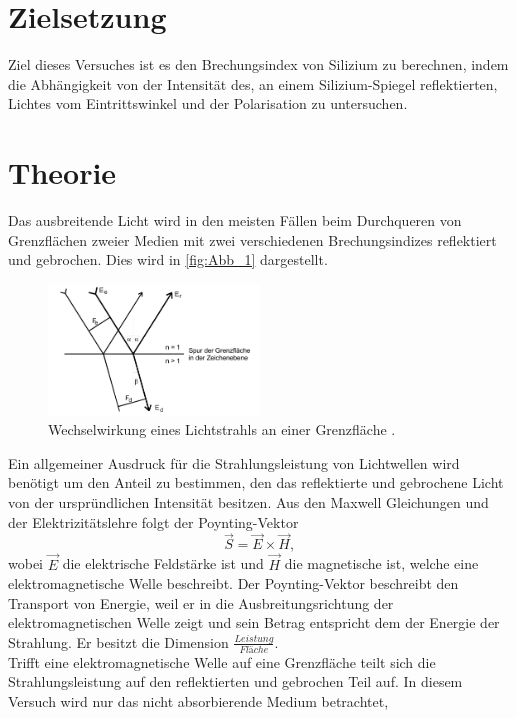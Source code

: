 \section{Zielsetzung}
\label{sec:Zielsetzung}
Ziel dieses Versuches ist es den Brechungsindex von Silizium zu berechnen, indem die
Abhängigkeit von der Intensität des, an einem Silizium-Spiegel reflektierten, Lichtes vom 
Eintrittswinkel und der Polarisation zu untersuchen.
\section{Theorie}
\label{sec:Theorie}
Das ausbreitende Licht wird in den meisten Fällen beim Durchqueren von Grenzflächen zweier
Medien mit zwei verschiedenen Brechungsindizes reflektiert und gebrochen. Dies wird in \autoref{fig:Abb_1} dargestellt.
\begin{figure}[H]
    \centering
    \includegraphics[width=0.5\textwidth]{Abbildung/Abb_1.png}
    \caption {Wechselwirkung eines Lichtstrahls an einer Grenzfläche \cite[42]{V407}.}
    \label{fig:Abb_1}
\end{figure}
Ein allgemeiner Ausdruck für die Strahlungsleistung von Lichtwellen wird benötigt um den Anteil zu bestimmen,
den das reflektierte und gebrochene Licht von der urspründlichen Intensität besitzen.
Aus den Maxwell Gleichungen und der Elektrizitätslehre folgt der Poynting-Vektor
\begin{equation*}
    \vec{S} = \vec{E} \times \vec{H},
    \label{eqn:Poynting}
\end{equation*}
wobei $\vec{E}$ die elektrische Feldstärke ist und $\vec{H}$ die magnetische ist, welche eine
elektromagnetische Welle beschreibt. Der Poynting-Vektor beschreibt den Transport von Energie,
weil er in die Ausbreitungsrichtung der elektromagnetischen Welle zeigt und sein Betrag entspricht
dem der Energie der Strahlung. Er besitzt die Dimension $\frac{Leistung}{Fläche}$.\\
Trifft eine elektromagnetische Welle auf eine Grenzfläche teilt sich die Strahlungsleistung auf den 
reflektierten und gebrochen Teil auf. In diesem Versuch wird nur das nicht absorbierende Medium betrachtet,
